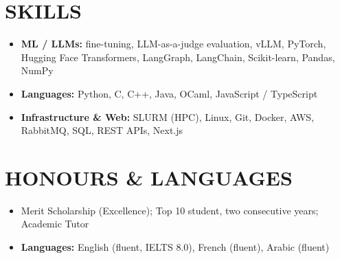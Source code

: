 \documentclass[10pt, a4paper]{article}
\begin{document}
\section*{SKILLS}
\begin{itemize}
    \item \textbf{ML / LLMs:} fine-tuning, LLM-as-a-judge evaluation, vLLM, PyTorch, Hugging Face Transformers, LangGraph, LangChain, Scikit-learn, Pandas, NumPy
    \item \textbf{Languages:} Python, C, C++, Java, OCaml, JavaScript / TypeScript
    \item \textbf{Infrastructure \& Web:} SLURM (HPC), Linux, Git, Docker, AWS, RabbitMQ, SQL, REST APIs, Next.js
\end{itemize}

\section*{HONOURS \& LANGUAGES}
\begin{itemize}
    \item Merit Scholarship (Excellence); Top 10 student, two consecutive years; Academic Tutor
    \item \textbf{Languages:} English (fluent, IELTS 8.0), French (fluent), Arabic (fluent)
\end{itemize}
\end{document}
